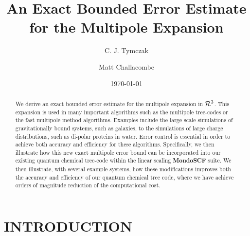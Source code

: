 \documentclass[prb,aps,nobibnotes,twocolumn,doublespace,twocolumngrid,superbib]{revtex4}
\begin{document}
\title{An Exact Bounded Error Estimate for the Multipole Expansion}

\author{C. J. Tymczak}
\author{Matt Challacombe}


\date{\today}

\begin{abstract}
We derive an exact bounded error estimate for the multipole expansion in ${\cal R}^3$.
%
This expansion is used in many important algorithms such as the multipole tree-codes 
or the fast multipole method  algorithms. 
%
Examples include the large scale simulations of gravitationally bound systems, such as galaxies, to
the simulations of large charge distributions, such as di-polar proteins in water. 
%
Error control is essential in order to achieve both  accuracy and efficiency for these algorithms. 
%
Specifically, we then illustrate how this new exact multipole error bound can be incorporated 
into our existing  quantum chemical tree-code within the linear scaling {\bf MondoSCF} suite.
%  
We then illustrate, with several example systems,  how these modifications improves both the 
accuracy and efficiency of our quantum chemical tree code, where we have achieve orders of 
magnitude reduction of the computational cost.
%
\end{abstract}

\maketitle



\section{INTRODUCTION}
\end{document}

